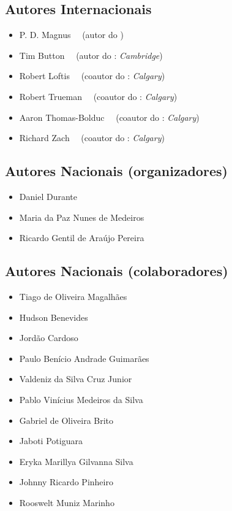 {\small \subsection{Autores Internacionais}
\begin{itemize}
	\item P. D. Magnus \ \  (autor do \forallx)
	\item Tim Button \ \ (autor do \forallx: \textit{Cambridge})
	\item Robert Loftis \ \ (coautor do \forallx: \textit{Calgary})
	\item Robert Trueman \ \ (coautor do \forallx: \textit{Calgary})
	\item Aaron Thomas-Bolduc \ \ (coautor do \forallx: \textit{Calgary})
	\item Richard Zach \ \ (coautor do \forallx: \textit{Calgary})
\end{itemize}
  
\subsection{Autores Nacionais (organizadores)}
\begin{itemize}
	\item Daniel Durante 
	\item Maria da Paz Nunes de Medeiros
	\item Ricardo Gentil de Araújo Pereira
\end{itemize}

\subsection{Autores Nacionais (colaboradores)}
\begin{itemize}
	\item Tiago de Oliveira Magalhães
	\item Hudson Benevides
	\item Jordão Cardoso
	\item Paulo Benício Andrade Guimarães
	\item Valdeniz da Silva Cruz Junior
	\item Pablo Vinícius Medeiros da Silva
	\item Gabriel de Oliveira Brito
	\item Jaboti Potiguara
	\item Eryka Marillya Gilvanna Silva
	\item Johnny Ricardo Pinheiro
	\item Rooswelt Muniz Marinho
\end{itemize}}

